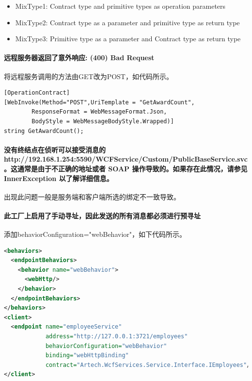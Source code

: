 \documentclass{book}
\begin{document}
\begin{itemize}
\item{MixType1: Contract type and primitive types as operation parameters}
\item{MixType2: Contract type as a parameter and primitive type as return type}
\item{MixType3: Primitive type as a parameter and Contract type as return type}
\end{itemize}

\paragraph{远程服务器返回了意外响应: (400) Bad Request}

将远程服务调用的方法由GET改为POST，如代码所示。

\begin{lstlisting}[language={[Sharp]C},caption=改变调用方式]
[OperationContract]
[WebInvoke(Method="POST",UriTemplate = "GetAwardCount",
        ResponseFormat = WebMessageFormat.Json,
        BodyStyle = WebMessageBodyStyle.Wrapped)]
string GetAwardCount();
\end{lstlisting}

\paragraph{没有终结点在侦听可以接受消息的 http://192.168.1.254:5590/WCFService/Custom/PublicBaseService.svc。这通常是由于不正确的地址或者 SOAP 操作导致的。如果存在此情况，请参见 InnerException 以了解详细信息。}

出现此问题一般是服务端和客户端所选的绑定不一致导致。


\paragraph{此工厂上启用了手动寻址，因此发送的所有消息都必须进行预寻址}

添加behaviorConfiguration="webBehavior"，如下代码所示。

\begin{lstlisting}[language=XML]
<behaviors>
  <endpointBehaviors>
    <behavior name="webBehavior">
      <webHttp/>
    </behavior>
  </endpointBehaviors>      
</behaviors>
<client>
  <endpoint name="employeeService"
            address="http://127.0.0.1:3721/employees" 
            behaviorConfiguration="webBehavior"
            binding="webHttpBinding" 
            contract="Artech.WcfServices.Service.Interface.IEmployees"/>
</client>
\end{lstlisting}
\end{document}
